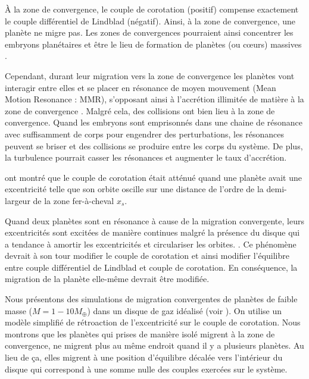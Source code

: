 \bigskip

À la zone de convergence, le couple de corotation (positif) compense exactement le couple différentiel de Lindblad (négatif). Ainsi, à la zone de convergence, une planète ne migre pas. Les zones de convergences pourraient ainsi concentrer les embryons planétaires et être le lieu de formation de planètes (ou cœurs) massives \citep{lyra2010orbital, horn2012orbital}. 

Cependant, durant leur migration vers la zone de convergence les planètes vont interagir entre elles et se placer en résonance de moyen mouvement (Mean Motion Resonance : MMR), s'opposant ainsi à l'accrétion illimitée de matière à la zone de convergence \citep{morbidelli2008building, sandor2011formation}. Malgré cela, des collisions ont bien lieu à la zone de convergence. Quand les embryons sont emprisonnés dans une chaine de résonance avec suffisamment de corps pour engendrer des perturbations, les résonances peuvent se briser et des collisions se produire entre les corps du système. De plus, la turbulence pourrait casser les résonances et augmenter le taux d'accrétion.

\bigskip

\cite{bitsch2010orbital} ont montré que le couple de corotation était atténué quand une planète avait une excentricité telle que son orbite oscille sur une distance de l'ordre de la demi-largeur de la zone fer-à-cheval $x_s$. 

Quand deux planètes sont en résonance à cause de la migration convergente, leurs excentricités sont excitées de manière continues malgré la présence du disque qui a tendance à amortir les excentricités et circulariser les orbites. \citep[par exemple ][]{cresswell2008three}. Ce phénomène devrait à son tour modifier le couple de corotation et ainsi modifier l'équilibre entre couple différentiel de Lindblad et couple de corotation. En conséquence, la migration de la planète elle-même devrait être modifiée.

\bigskip

Nous présentons des simulations de migration convergentes de planètes de faible masse ($M=1-10\unit{M_\oplus}$) dans un disque de gaz idéalisé (voir ). On utilise un modèle simplifié de rétroaction de l'excentricité sur le couple de corotation. Nous montrons que les planètes qui prises de manière isolé migrent à la zone de convergence, ne migrent plus au même endroit quand il y a plusieurs planètes. Au lieu de ça, elles migrent à une position d'équilibre décalée vers l'intérieur du disque qui correspond à une somme nulle des couples exercées sur le système. 

